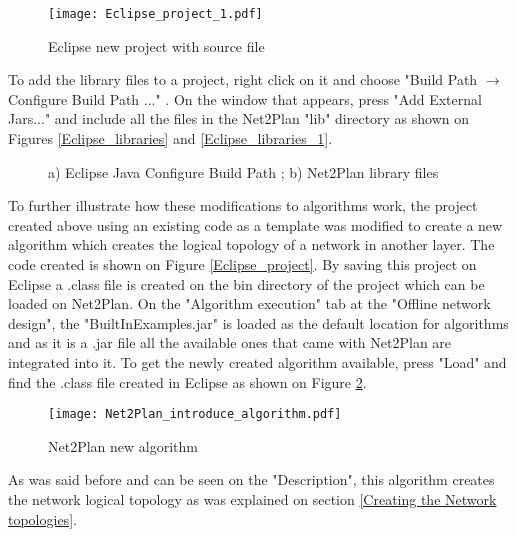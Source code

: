 \documentclass[12pt, a4paper]{article}
\begin{document}
	\vspace{1.5cm}
	\begin{figure}[h!]
		\centering
		\texttt{[image: Eclipse\_project\_1.pdf]}
		\caption{Eclipse new project with source file}
		\label{Eclipse_project_1}
	\end{figure}	
	
	To add the library files to a project, right click on it and choose "Build Path $\rightarrow$ Configure Build Path ..." . On the window that appears, press "Add External Jars..." and include all the files in the Net2Plan "lib" directory as shown on Figures \ref{Eclipse_libraries} and \ref{Eclipse_libraries_1}.
	
	\vspace{1.5cm}
	\begin{figure}[!h]
		\centering
		\caption{a) Eclipse Java Configure Build Path ; b) Net2Plan library files}
	\end{figure}	
	

	
	To further illustrate how these modifications to algorithms work, the project created above using an existing code as a template was modified to create a new algorithm which creates the logical topology of a network in another layer.
	\newpage
	 The code created is shown on Figure \ref{Eclipse_project}.
	By saving this project on Eclipse a .class file is created on the bin directory of the project which can be loaded on Net2Plan. On the "Algorithm execution" tab at the "Offline network design", the "BuiltInExamples.jar" is loaded as the default location for algorithms and as it is a .jar file all the available ones that came with Net2Plan are integrated into it.	To get the newly created algorithm available, press "Load" and find the .class file created in Eclipse as shown on Figure \ref{Net2Plan_introduce_algorithm}.
	
	\begin{figure}[h!]
		\centering
		\texttt{[image: Net2Plan\_introduce\_algorithm.pdf]}
		\caption{Net2Plan new algorithm}
		\label{Net2Plan_introduce_algorithm}
	\end{figure}
			
				
			
	As was said before and can be seen on the "Description", this algorithm creates the network logical topology as was explained on section \ref{Creating the Network topologies}.
			
\end{document}
